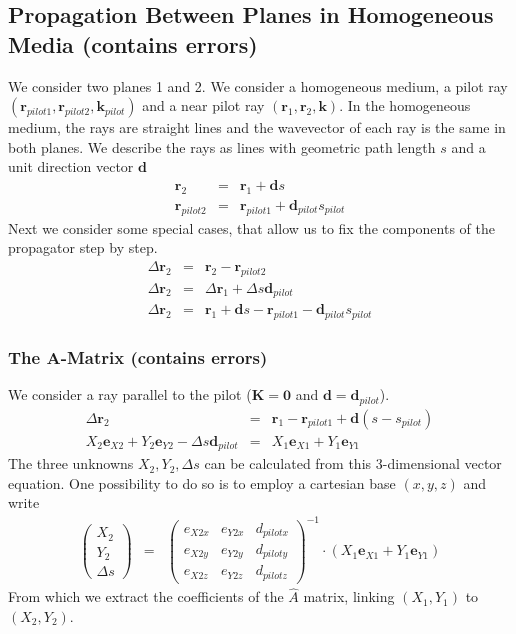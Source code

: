 \documentclass[12pt,a4paper,twoside,openright,BCOR10mm,headsepline,titlepage,abstracton,chapterprefix,final]{scrreprt}
\newcommand\Vector[1]{{\mathbf{#1}}}
\newcommand\wavenumber{k}
\newcommand\Wavevector{\Vector{\wavenumber}}
\begin{document}
\subsection{Propagation Between Planes in Homogeneous Media (contains errors)}
We consider two planes 1 and 2.
We consider a homogeneous medium, a pilot ray $( \Vector{r}_{pilot1}, \Vector{r}_{pilot2}, \Wavevector_{pilot} )$
and a near pilot ray $( \Vector{r}_{1}, \Vector{r}_{2}, \Wavevector )$. 
In the homogeneous medium, the rays are straight lines and the wavevector of each ray is the same in both planes.
We describe the rays as lines with geometric path length $s$ and a unit direction vector $\Vector{d}$
\begin{eqnarray}
 \Vector{r}_{2} &=& \Vector{r}_{1} + \Vector{d} s  \\
 \Vector{r}_{pilot2} &=& \Vector{r}_{pilot1} + \Vector{d}_{pilot} s_{pilot}
\end{eqnarray}
Next we consider some special cases, that allow us to fix the components of the propagator step by step.
\begin{eqnarray}
 \Delta \Vector{r}_2 &=& \Vector{r}_{2} - \Vector{r}_{pilot2} \\
 \Delta \Vector{r}_2 &=& \Delta \Vector{r}_1 + \Delta s \Vector{d}_{pilot} \\
 \Delta \Vector{r}_2 &=& \Vector{r}_{1} + \Vector{d} s  - \Vector{r}_{pilot1} - \Vector{d}_{pilot} s_{pilot}
\end{eqnarray}

\subsubsection{The A-Matrix (contains errors)}
We consider a ray parallel to the pilot ($\Vector{K} = \Vector{0}$ and $\Vector{d} = \Vector{d}_{pilot}$).
\begin{eqnarray}
 \Delta \Vector{r}_2 &=& \Vector{r}_{1} - \Vector{r}_{pilot1} + \Vector{d} ( s - s_{pilot} ) \\
 X_2 \Vector{e}_{X2} +  Y_2 \Vector{e}_{Y2} - \Delta s \Vector{d}_{pilot} &=&  X_1 \Vector{e}_{X1} +  Y_1 \Vector{e}_{Y1} 
\end{eqnarray}
The three unknowns $X_2 , Y_2, \Delta s$ can be calculated from this 3-dimensional vector equation.
One possibility to do so is to employ a cartesian base $(x,y,z)$ and write
\begin{eqnarray}
 \begin{pmatrix}
  X_2 \\ Y_2 \\ \Delta s
 \end{pmatrix}
 &=&
 \begin{pmatrix}
  e_{X2x} & e_{Y2x} & d_{pilotx} \\
  e_{X2y} & e_{Y2y} & d_{piloty} \\
  e_{X2z} & e_{Y2z} & d_{pilotz}  
 \end{pmatrix}^{-1}
 \cdot
 \left(
 X_1 \Vector{e}_{X1} + Y_1 \Vector{e}_{Y1}
 \right)
\end{eqnarray}
From which we extract the coefficients of the $\hat{A}$ matrix, 
linking $(X_1,Y_1)$ to $(X_2,Y_2)$.
\end{document}
